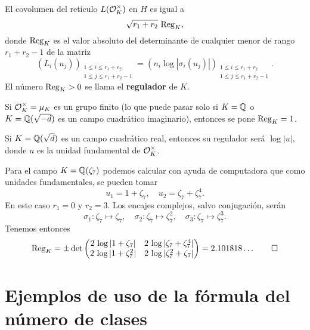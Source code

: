 \begin{proposicion-definicion}
  El covolumen del retículo $L (\mathcal{O}_K^\times)$ en $H$ es igual a
  $$\sqrt{r_1 + r_2} \, \operatorname{Reg}_K,$$
  donde $\operatorname{Reg}_K$ es el valor absoluto del determinante de cualquier menor
  de rango $r_1 + r_2 - 1$ de la matriz
  \[ (L_i (u_j))_{\substack{1 \le i \le r_1 + r_2 \\ 1 \le j \le r_1 + r_2 - 1}} =
     (n_i \log |\sigma_i (u_j)|)_{\substack{1 \le i \le r_1 + r_2 \\ 1 \le j \le r_1 + r_2 - 1}}. \]
  El número $\operatorname{Reg}_K > 0$ se llama el \textbf{regulador} de $K$.
\end{proposicion-definicion}

Si $\mathcal{O}_K^\times = \mu_K$ es un grupo finito (lo que puede pasar solo si
$K = \mathbb{Q}$ o $K = \mathbb{Q} (\sqrt{-d})$ es un campo cuadrático imaginario),
entonces se pone $\operatorname{Reg}_K = 1$.

\begin{ejemplo}
  Si $K = \mathbb{Q} (\sqrt{d})$ es un campo cuadrático real, entonces su regulador
  será $\log |u|$, donde $u$ es la unidad fundamental de $\mathcal{O}_K^\times$.
\end{ejemplo}

\begin{ejemplo}
  Para el campo $K = \mathbb{Q} (\zeta_7)$ podemos calcular con ayuda de computadora
  que como unidades fundamentales, se pueden tomar
  $$u_1 = 1 + \zeta_7, \quad u_2 = \zeta_7 + \zeta_7^4.$$
  En este caso $r_1 = 0$ y $r_2 = 3$. Los encajes complejos, salvo conjugación,
  serán
  \[ \sigma_1\colon \zeta_7 \mapsto \zeta_7, \quad
     \sigma_2\colon \zeta_7 \mapsto \zeta_7^2, \quad
     \sigma_3\colon \zeta_7 \mapsto \zeta_7^3. \]
  Tenemos entonces
  \[ \operatorname{Reg}_K = \pm\det\begin{pmatrix}
    2\,\log |1 + \zeta_7| & 2\,\log |\zeta_7 + \zeta_7^4| \\
    2\,\log |1 + \zeta_7^2| & 2\,\log |\zeta_7^2 + \zeta_7| \\
  \end{pmatrix} = 2.101818\ldots \qedhere \]
\end{ejemplo}


\section{Ejemplos de uso de la fórmula del número de clases}

